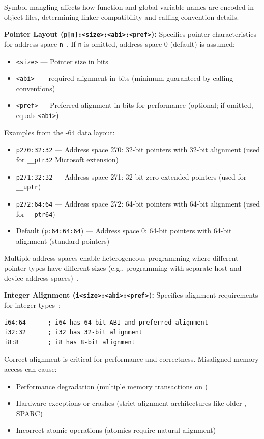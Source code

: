 Symbol mangling affects how function and global variable names are encoded in object files, determining linker compatibility and calling convention details.

\textbf{Pointer Layout (\texttt{p[n]:<size>:<abi>:<pref>}):} Specifies pointer characteristics for address space \texttt{n}~\cite{llvmlangref}. If \texttt{n} is omitted, address space 0 (default) is assumed:
\begin{itemize}[noitemsep]
  \item \texttt{<size>} --- Pointer size in bits
  \item \texttt{<abi>} --- -required alignment in bits (minimum guaranteed by calling conventions)
  \item \texttt{<pref>} --- Preferred alignment in bits for performance (optional; if omitted, equals \texttt{<abi>})
\end{itemize}

Examples from the -64 data layout:
\begin{itemize}[noitemsep]
  \item \texttt{p270:32:32} --- Address space 270: 32-bit pointers with 32-bit alignment (used for \texttt{\_\_ptr32} Microsoft extension)
  \item \texttt{p271:32:32} --- Address space 271: 32-bit zero-extended pointers (used for \texttt{\_\_uptr})
  \item \texttt{p272:64:64} --- Address space 272: 64-bit pointers with 64-bit alignment (used for \texttt{\_\_ptr64})
  \item Default (\texttt{p:64:64:64}) --- Address space 0: 64-bit pointers with 64-bit alignment (standard pointers)
\end{itemize}

Multiple address spaces enable heterogeneous programming where different pointer types have different sizes (e.g.,  programming with separate host and device address spaces)~\cite{lopesauler2014}.

\textbf{Integer Alignment (\texttt{i<size>:<abi>:<pref>}):} Specifies alignment requirements for integer types~\cite{llvmlangref}:

\begin{lstlisting}[style=ir]
i64:64      ; i64 has 64-bit ABI and preferred alignment
i32:32      ; i32 has 32-bit alignment
i8:8        ; i8 has 8-bit alignment
\end{lstlisting}

Correct alignment is critical for performance and correctness. Misaligned memory access can cause:
\begin{itemize}[noitemsep]
  \item Performance degradation (multiple memory transactions on )
  \item Hardware exceptions or crashes (strict-alignment architectures like older , SPARC)
  \item Incorrect atomic operations (atomics require natural alignment)
\end{itemize}

